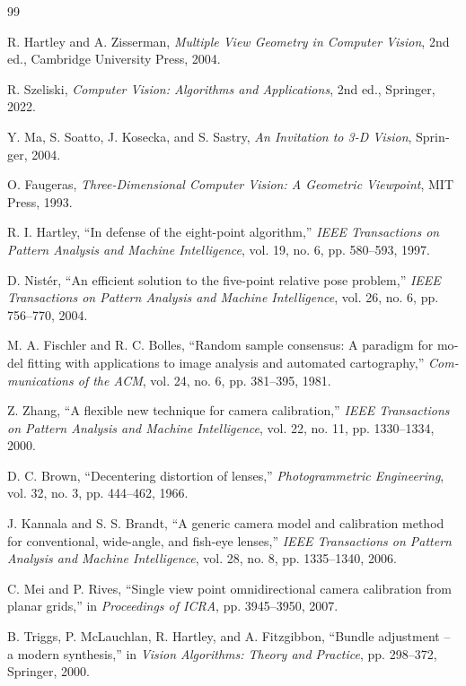 \documentclass[12pt,openany,oneside]{book}
\begin{document}
\begin{latin}
\begin{thebibliography}{99}

R. Hartley and A. Zisserman,
\textit{Multiple View Geometry in Computer Vision}, 2nd ed., Cambridge University Press, 2004.

R. Szeliski,
\textit{Computer Vision: Algorithms and Applications}, 2nd ed., Springer, 2022.

Y. Ma, S. Soatto, J. Kosecka, and S. Sastry,
\textit{An Invitation to 3-D Vision}, Springer, 2004.

O. Faugeras,
\textit{Three-Dimensional Computer Vision: A Geometric Viewpoint}, MIT Press, 1993.

R. I. Hartley,
``In defense of the eight-point algorithm,''
\textit{IEEE Transactions on Pattern Analysis and Machine Intelligence}, vol. 19, no. 6, pp. 580--593, 1997.

D. Nistér,
``An efficient solution to the five-point relative pose problem,''
\textit{IEEE Transactions on Pattern Analysis and Machine Intelligence}, vol. 26, no. 6, pp. 756--770, 2004.

M. A. Fischler and R. C. Bolles,
``Random sample consensus: A paradigm for model fitting with applications to image analysis and automated cartography,''
\textit{Communications of the ACM}, vol. 24, no. 6, pp. 381--395, 1981.

Z. Zhang,
``A flexible new technique for camera calibration,''
\textit{IEEE Transactions on Pattern Analysis and Machine Intelligence}, vol. 22, no. 11, pp. 1330--1334, 2000.

D. C. Brown,
``Decentering distortion of lenses,''
\textit{Photogrammetric Engineering}, vol. 32, no. 3, pp. 444--462, 1966.

J. Kannala and S. S. Brandt,
``A generic camera model and calibration method for conventional, wide-angle, and fish-eye lenses,''
\textit{IEEE Transactions on Pattern Analysis and Machine Intelligence}, vol. 28, no. 8, pp. 1335--1340, 2006.

C. Mei and P. Rives,
``Single view point omnidirectional camera calibration from planar grids,''
in \textit{Proceedings of ICRA}, pp. 3945--3950, 2007.

B. Triggs, P. McLauchlan, R. Hartley, and A. Fitzgibbon,
``Bundle adjustment -- a modern synthesis,''
in \textit{Vision Algorithms: Theory and Practice}, pp. 298--372, Springer, 2000.


\end{thebibliography}
\end{latin}
\end{document}
